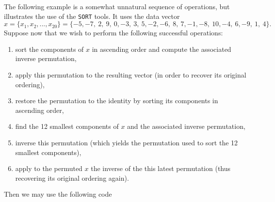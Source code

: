 \documentclass{galahad}
\newcommand{\packagename}{SORT}
\begin{document}
\galexample
The following example is a somewhat unnatural sequence of operations, but
illustrates the use of the {\tt \packagename} tools. It uses the data vector
\[
x = \{ x_1 ,   x_2 ,  ...  , x_{20} \} =
\{ -5,  -7,  ~2,  ~9,  ~0,  -3,  ~3,  ~5,  -2,  -6,  
 ~8,  ~7,  -1,  -8,  ~10,  -4,  ~6,  -9,  ~1,  ~4 \}.
\]
Suppose now that we wish to perform the following successful operations:
\begin{enumerate}
\item sort the components of $x$ in ascending order and compute the associated
inverse permutation,
\item apply this permutation to the resulting vector (in order to recover its
original ordering),
\item restore the permutation to the identity by sorting its components in
ascending order,
\item find the 12 smallest components of $x$ and the associated inverse
permutation,
\item inverse this permutation (which yields the permutation used to sort the
12 smallest components),
\item 
apply to the permuted $x$ the inverse of the this latest permutation (thus
recovering its original ordering again).
\end{enumerate}
Then we may use the following code
\end{document}
